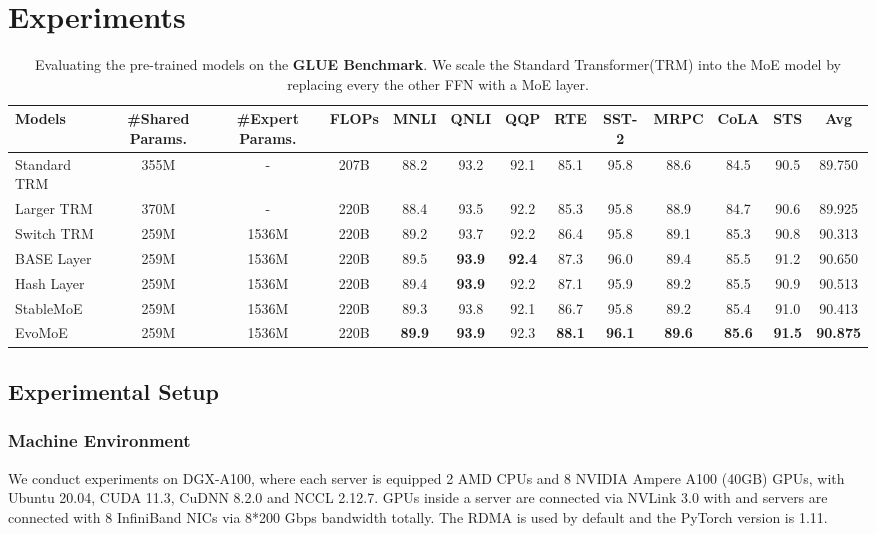 \section{Experiments}
\label{sec:experiment}
\begin{table*}[t]
    \caption{Evaluating the pre-trained models on the \textbf{GLUE Benchmark}. We scale the Standard Transformer(TRM) into the MoE model by replacing every the other FFN with a MoE layer.}
        \begin{center}
            \begin{tabular}{l|ccc|cccccccc|c}
            \toprule 
            \textbf{Models} & \textbf{\#Shared Params.} & \textbf{\#Expert Params.} &\textbf{FLOPs}& \textbf{MNLI} & \textbf{QNLI} & \textbf{QQP} & \textbf{RTE} & \textbf{SST-2} & \textbf{MRPC} & \textbf{CoLA} & \textbf{STS} & \textbf{Avg} \\
            \midrule
            Standard TRM& 355M & -& 207B & 88.2& 93.2& 92.1 & 85.1 & 95.8 & 88.6 & 84.5 & 90.5 & 89.750\\
            Larger TRM& 370M &  -&  220B& 88.4& 93.5& 92.2 & 85.3 & 95.8 & 88.9 & 84.7 & 90.6 & 89.925\\
            \midrule
            Switch TRM& 259M & 1536M & 220B&89.2& 93.7 & 92.2 & 86.4& 95.8 & 89.1& 85.3 & 90.8 & 90.313\\
            BASE Layer & 259M &1536M & 220B&89.5& \textbf{93.9}& \textbf{92.4}& 87.3 & 96.0 & 89.4 & 85.5 & 91.2 & 90.650\\
            Hash Layer&259M &1536M & 220B&89.4& \textbf{93.9}& 92.2 & 87.1 & 95.9 & 89.2 & 85.5 & 90.9 & 90.513\\
            StableMoE &259M &1536M & 220B&89.3& 93.8 & 92.1 & 86.7& 95.8& 89.2 & 85.4 & 91.0 & 90.413\\
            EvoMoE &259M &1536M & 220B& \textbf{89.9} & \textbf{93.9} & 92.3 & \textbf{88.1} & \textbf{96.1} & \textbf{89.6} & \textbf{85.6} & \textbf{91.5} & \textbf{90.875}\\
            \bottomrule
            \end{tabular}
        \end{center}
\label{tab:roberta_glue}
\end{table*}

\subsection{Experimental Setup}

\subsubsection{Machine Environment}
We conduct experiments on DGX-A100, where each server is equipped 2 AMD CPUs and 8 NVIDIA Ampere A100 (40GB) GPUs, with Ubuntu 20.04, CUDA 11.3, CuDNN 8.2.0 and NCCL 2.12.7. GPUs inside a server are connected via NVLink 3.0
with and servers are connected with 8 InfiniBand NICs via 8*200 Gbps bandwidth totally. The RDMA is used by default and the PyTorch version is 1.11. \\ \\

